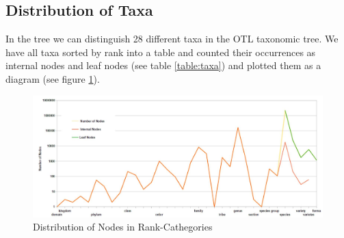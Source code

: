     \subsection{Distribution of Taxa}
      In the tree we can distinguish 28 different taxa in the OTL taxonomic tree. We have all taxa 
        sorted by rank into a table and counted their occurrences as internal nodes and leaf nodes
        (see table \ref{table:taxa}) and plotted them as a diagram (see figure \ref{fig:taxa}).
    \begin{figure}[h!]
      \centering
      \includegraphics[width=\textwidth]{Figures/TaxaTable2.JPG}
      \caption{Distribution of Nodes in Rank-Cathegories}
      \label{fig:taxa}
    \end{figure}

